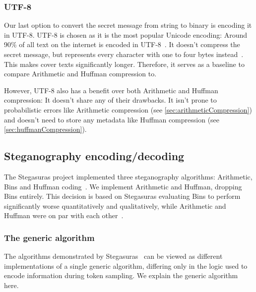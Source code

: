 \subsubsection{UTF-8}
\label{sec:utf8}
Our last option to convert the secret message from string to binary is encoding it in UTF-8. UTF-8 is chosen as it is the most popular Unicode encoding: Around 90\% of all text on the internet is encoded in UTF-8~\cite{gleaveMakingCompressionAlgorithms2017}. It doesn't compress the secret message, but represents every character with one to four bytes instead~\cite{gleaveMakingCompressionAlgorithms2017}. This makes cover texts significantly longer. Therefore, it serves as a baseline to compare Arithmetic and Huffman compression to.

However, UTF-8 also has a benefit over both Arithmetic and Huffman compression: It doesn't share any of their drawbacks. It isn't prone to probabilistic errors like Arithmetic compression (see \cref{sec:arithmeticCompression}) and doesn't need to store any metadata like Huffman compression (see \cref{sec:huffmanCompression}).

\subsection{Steganography encoding/decoding}
\label{sec:steganographyEncodingDecoding}
The Stegasuras project implemented three steganography algorithms: Arithmetic, Bins and Huffman coding~\cite{zieglerNeuralLinguisticSteganography2019}. We implement Arithmetic and Huffman, dropping Bins entirely. This decision is based on Stegasuras evaluating Bins to perform significantly worse quantitatively and qualitatively, while Arithmetic and Huffman were on par with each other~\cite{zieglerNeuralLinguisticSteganography2019}.

\subsubsection{The generic algorithm}
\label{sec:theGenericAlgorithm}
The algorithms demonstrated by Stegasuras~\cite{zieglerNeuralLinguisticSteganography2019} can be viewed as different implementations of a single generic algorithm, differing only in the logic used to encode information during token sampling. We explain the generic algorithm here.


